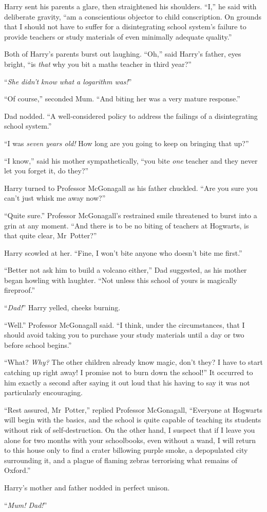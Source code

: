 Harry sent his parents a glare, then straightened his
shoulders. “I,” he said with deliberate gravity, “am a
conscientious objector to child conscription. On grounds that
I should not have to suffer for a disintegrating school
system’s failure to provide teachers or study materials of
even minimally adequate quality.”

Both of Harry’s parents burst out laughing.
“Oh,” said Harry’s father, eyes bright, “is \emph{that} why you
bit a maths teacher in third year?”

“\emph{She didn’t know what a logarithm was!}”

“Of course,” seconded Mum. “And biting her was a very mature response.”

Dad nodded. “A well-considered policy to address the
failings of a disintegrating school system.”

“I was \emph{seven years old!} How long are you going to keep on bringing that
up?”

“I know,” said his mother sympathetically, “you bite \emph{one} teacher
and they never let you forget it, do they?”

Harry turned to Professor McGonagall as his father
chuckled. “Are you sure you can’t just whisk me away now?”

“Quite sure.” Professor McGonagall’s restrained smile
threatened to burst into a grin at any moment. “And there
is to be no biting of teachers at Hogwarts, is that quite
clear, Mr~Potter?”

Harry scowled at her. “Fine, I won’t bite anyone who
doesn’t bite me first.”

“Better not ask him to build a volcano either,” Dad
suggested, as his mother began howling with laughter.
“Not unless this school of yours is magically fireproof.”

“\emph{Dad!}” Harry yelled, cheeks burning.

“Well.” Professor McGonagall said. “I think, under the
circumstances, that I should avoid taking you to purchase
your study materials until a day or two before school begins.”

“What? \emph{Why?} The other children already know magic, don’t
they? I have to start catching up right away! I promise
not to burn down the school!” It occurred to him exactly a
second after saying it out loud that his having to say it
was not particularly encouraging.

“Rest assured, Mr~Potter,” replied Professor McGonagall,
“Everyone at Hogwarts will begin with the basics, and the
school is quite capable of teaching its students without risk
of self-destruction. On the other hand, I suspect that if I
leave you alone for two months with your schoolbooks,
even without a wand, I will return to this house only to
find a crater billowing purple smoke, a depopulated city
surrounding it, and a plague of flaming zebras terrorising
what remains of Oxford.”

Harry’s mother and father nodded in perfect unison.

“\emph{Mum! Dad!}”

